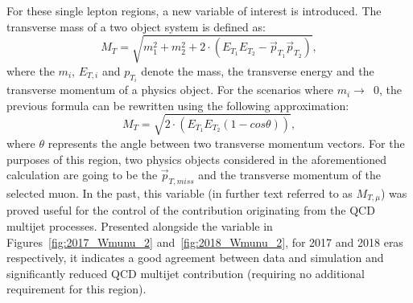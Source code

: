 \hspace{10pt} For these single lepton regions, a new variable of interest is introduced. The transverse mass of a two object system is defined as:
\begin{equation}
    M_T= \sqrt{m_1^2+m_2^2+2\cdot(E_{T_1}E_{T_2}-\vec{p}_{T_1}\vec{p}_{T_2})},
\end{equation}
where the $m_i$, $E_{T,i}$ and $p_{T_i}$ denote the mass, the transverse energy and the transverse momentum of a physics object. For the scenarios where $m_i\rightarrow$~0, the previous formula can be rewritten using the following approximation:
\begin{equation}
    M_T= \sqrt{2\cdot(E_{T_1}E_{T_2}(1-cos\theta))},
\end{equation}
where $\theta$ represents the angle between two transverse momentum vectors. For the purposes of this region, two physics objects considered in the aforementioned calculation are going to be the $\vec{p}_{T, miss}$ and the transverse momentum of the selected muon. In the past, this variable (in further text referred to as $M_{T, \mu}$) was proved useful for the control of the contribution originating from the QCD multijet processes. Presented alongside the \mindphinomu variable in Figures~\ref{fig:2017_Wmunu_2} and~\ref{fig:2018_Wmunu_2}, for 2017 and 2018 eras respectively, it indicates a good agreement between data and simulation and significantly reduced QCD multijet contribution (requiring no additional requirement for this region).




